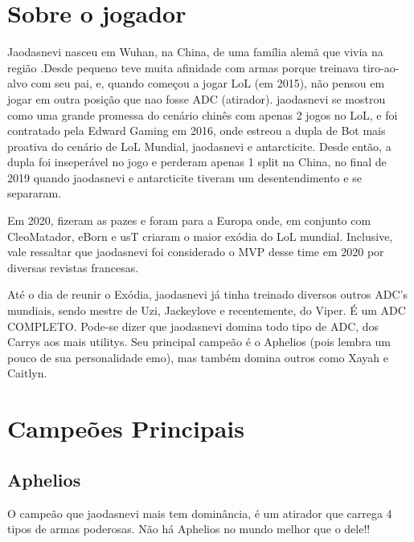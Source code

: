 \begin{multicols}{2}
	\section*{Sobre o jogador}
	Jaodasnevi nasceu em Wuhan, na China, de uma família alemã que vivia na região .Desde pequeno teve muita afinidade com armas porque treinava tiro-ao-alvo com seu pai, e, quando começou a jogar LoL (em 2015), não pensou em jogar em outra posição que nao fosse ADC (atirador). jaodasnevi se mostrou como uma grande promessa do cenário chinês com apenas 2 jogos no LoL, e foi contratado pela Edward Gaming em 2016, onde estreou a dupla de Bot mais proativa do cenário de LoL Mundial, jaodasnevi e antarcticite. Desde então, a dupla foi inseperável no jogo e perderam apenas 1 split na China, no final de 2019 quando jaodasnevi e antarcticite tiveram um desentendimento e se separaram.
	
	Em 2020, fizeram as pazes e foram para a Europa onde, em conjunto com CleoMatador, eBorn e usT criaram o maior exódia do LoL mundial. Inclusive, vale ressaltar que jaodasnevi foi considerado o MVP desse time em 2020 por diversas revistas francesas.
	
	Até o dia de reunir o Exódia, jaodasnevi já tinha treinado diversos outros ADC's mundiais, sendo mestre de Uzi, Jackeylove e recentemente, do Viper. É um ADC COMPLETO. Pode-se dizer que jaodasnevi domina todo tipo de ADC, dos Carrys aos mais utilitys. Seu principal campeão é o Aphelios (pois lembra um pouco de sua personalidade emo), mas também domina outros como Xayah e Caitlyn.
	
	\section*{Campeões Principais}
	\subsection*{Aphelios}
	O campeão que jaodasnevi mais tem dominância, é um atirador que carrega 4 tipos de armas poderosas. Não há Aphelios no mundo melhor que o dele!!
	

\end{multicols}
